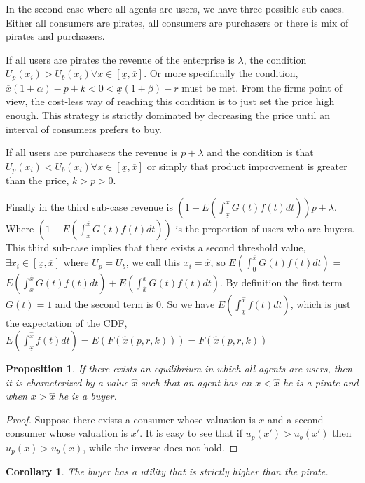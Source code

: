 \documentclass{article}
\newtheorem{corollary}{Corollary}
\newtheorem{proposition}{Proposition}
\begin{document}
In the second case where all agents are users, we have three possible sub-cases. Either all consumers are pirates, all consumers are purchasers or there is mix of pirates and purchasers.

If all users are pirates the revenue of the enterprise is $\lambda$, the condition $ U_p(x_i)>U_b(x_i) \forall x \in [\underline{x},\overline{x}] $. Or more specifically the condition, $\overline{x}(1+\alpha)-p+k<0<\underline{x}(1+\beta)-r$ must be met. From the firms point of view, the cost-less way of reaching this condition is to just set the price high enough. This strategy is strictly dominated by decreasing the price until an interval of consumers prefers to buy.

If all users are purchasers the revenue is $p+\lambda$ and the condition is that $ U_p(x_i)<U_b(x_i) \forall x \in [\underline{x},\overline{x}] $ or simply that product improvement is greater than the price, $k>p>0$. 

Finally in the third sub-case revenue is $(1-E(\int^{\overline{x}}_{\underline{x}}G(t)f(t)dt)) p +\lambda$. Where $(1-E(\int^{\overline{x}}_{\underline{x}}G(t)f(t)dt))$ is the proportion of users who are buyers. This third sub-case implies that there exists a second threshold value, $\exists x_i \in [\underline{x},\overline{x}]$ where $U_p = U_b$, we call this $x_i = \hat{x}$, so $E(\int^{\overline{x}}_{0}G(t)f(t)dt)$ = $E(\int^{\hat{x}}_{\underline{x}}G(t)f(t)dt) +E(\int^{\overline{x}}_{\hat{x}}G(t)f(t)dt)$. By definition the first term $G(t) = 1$ and the second term is 0. So we have $E(\int^{\hat{x}}_{\underline{x}}f(t)dt)$, which is just the expectation of the CDF, $E(\int^{\hat{x}}_{\underline{x}}f(t)dt)=E(F(\hat{x}(p,r,k)))=F(\hat{x}(p,r,k))$

\begin{proposition}
If there exists an equilibrium in which all agents are users, then it is characterized by a value $\hat{x}$ such that an agent has an $x<\hat{x}$ he is a pirate and when $x>\hat{x}$ he is a buyer. 
\end{proposition}

\begin{proof}
Suppose there exists a consumer whose valuation is $x$ and a second consumer whose valuation is $x'$. It is easy to see that if $u_p(x')>u_b(x')$ then $u_p(x)>u_b(x)$, while the inverse does not hold.
\end{proof}

\begin{corollary}
The buyer has a utility that is strictly higher than the pirate.
\end{corollary}
\end{document}
